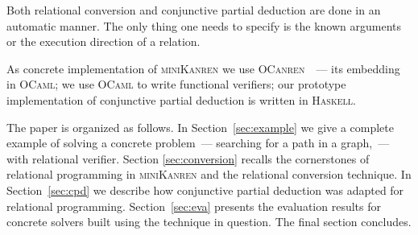 Both relational conversion and conjunctive partial deduction are done in an automatic manner. The only thing one needs to specify is the known arguments or the execution direction of a relation. 

As concrete implementation of \textsc{miniKanren} we use \textsc{OCanren}~\cite{lozov:ocanren}~--- its embedding in \textsc{OCaml}; we use
\textsc{OCaml} to write functional verifiers; our prototype implementation of conjunctive partial deduction is written in \textsc{Haskell}.

The paper is organized as follows. In Section~\ref{sec:example} we give a complete example of solving a concrete problem~--- searching for
a path in a graph,~--- with relational verifier. Section \ref{sec:conversion} recalls the cornerstones of relational programming in 
\textsc{miniKanren} and the relational conversion technique. In Section~\ref{sec:cpd} we describe how conjunctive partial deduction was 
adapted for relational programming. Section~\ref{sec:eva} presents the evaluation results for concrete solvers built using the technique
in question. The final section concludes.
